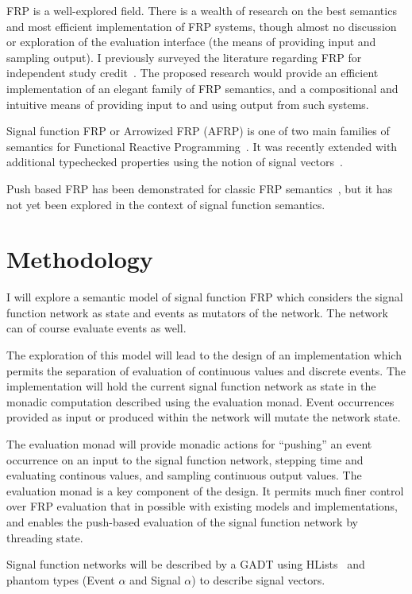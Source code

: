 \documentclass[11pt]{artikel3}
\begin{document}
FRP is a well-explored field. There is a wealth of research on the best semantics and most efficient implementation of FRP systems, though almost no discussion or exploration of the evaluation interface (the means of providing input and sampling output). I previously surveyed the literature regarding FRP for independent study credit~\cite{Amsden2011}. The proposed research would provide an efficient implementation of an elegant family of FRP semantics, and a compositional and intuitive means of providing input to and using output from such systems.

Signal function FRP or Arrowized FRP (AFRP) is one of two main families of semantics for Functional Reactive 
Programming~\cite{Nilsson2002}. It was recently extended with additional typechecked properties using the notion of signal 
vectors~\cite{Sculthorpe2011}.

Push based FRP has been demonstrated for classic FRP semantics~\cite{Elliott2009}, but it has not yet been explored in the context of signal function semantics.

\section{Methodology}
\label{sec:methodology}

I will explore a semantic model of signal function FRP which considers the signal function network as state and events
as mutators of the network. The network can of course evaluate events as well. 

The exploration of this model will lead to the design of an implementation which permits the separation of evaluation of
continuous values and discrete events. The implementation will hold the current signal function network as state in the monadic computation described using the evaluation monad. Event occurrences provided as input or produced within the network will mutate the network state.  

The evaluation monad will provide monadic actions for ``pushing'' an event occurrence on an input to the signal function network, stepping time and evaluating continous values, and sampling continuous output values. The evaluation monad is
a key component of the design. It permits much finer control over FRP evaluation that in possible with existing models and
implementations, and enables the push-based evaluation of the signal function network by threading state.

Signal function networks will be described by a GADT using HLists~\cite{Kiselyov2004} and phantom types (Event $\alpha$ and Signal $\alpha$) to describe signal vectors. 
\end{document}
